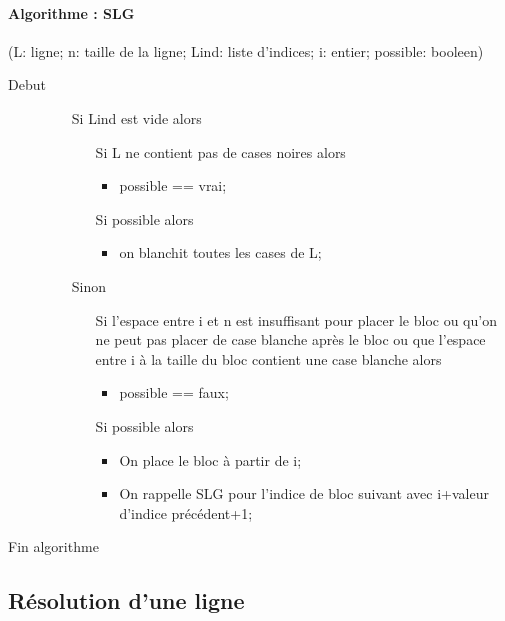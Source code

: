 \documentclass{article}
\begin{document}
\paragraph{Algorithme : SLG}(L: ligne; n: taille de la ligne; Lind: liste d'indices; i: entier; possible: booleen)
\begin{description}
\item[Debut]
\item[]
  \begin{itemize}
  \item[Si] Lind est vide alors 
    \begin{itemize}
    \item[Si] L ne contient pas de cases noires alors
      \begin{itemize}
      \item possible == vrai;
      \end{itemize}
    \item[Si] possible alors
      \begin{itemize}
      \item on blanchit toutes les cases de L;
      \end{itemize}
    \end{itemize}
  \item[Sinon]
    \begin{itemize}
    \item[Si] l'espace entre i et n est insuffisant pour placer le bloc ou qu'on ne peut pas placer de case blanche apr\`es le bloc ou que l'espace entre i \`a la taille du bloc contient une case blanche alors
      \begin{itemize}
      \item possible == faux;
      \end{itemize}
    \item[Si] possible alors 
      \begin{itemize}
    \item On place le bloc \`a partir de i;
    \item On rappelle SLG pour l'indice de bloc suivant avec i+valeur d'indice pr\'ec\'edent+1;
      \end{itemize}
    \end{itemize}
  \end{itemize}
\item[Fin algorithme]
\end{description}
\subsection{R\'esolution d'une ligne}
\end{document}
